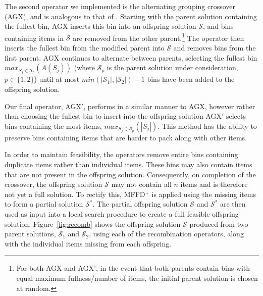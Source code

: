 \documentclass[authoryear]{elsarticle}
\begin{document}
The second operator we implemented is the alternating grouping crossover (AGX), and is analogous to that of \citet{quiroz2015}. Starting with the parent solution containing the fullest bin, AGX inserts this bin into an offspring solution $\mathcal{S}$, and bins containing items in $\mathcal{S}$ are removed from the other parent.\footnote{For both AGX and AGX', in the event that both parents contain bins with equal maximum fullness/number of items, the initial parent solution is chosen at random.} The operator then inserts the fullest bin from the modified parent into $\mathcal{S}$ and removes bins from the first parent. AGX continues to alternate between parents, selecting the fullest bin $max_{S_j \in \mathcal{S}_p} (A(S_j))$ (where $\mathcal{S}_p$ is the parent solution under consideration, $p \in \{1,2\}$) until at most $min (|\mathcal{S}_1|,|\mathcal{S}_2|) - 1$ bins have been added to the offspring solution.

Our final operator, AGX$'$, performs in a similar manner to AGX, however rather than choosing the fullest bin to insert into the offspring solution AGX$'$ selects bins containing the most items, $max_{S_j \in \mathcal{S}_p} (|S_j|)$. This method has the ability to preserve bins containing items that are harder to pack along with other items. 

In order to maintain feasibility, the operators remove entire bins containing duplicate items rather than individual items. These bins may also contain items that are not present in the offspring solution. Consequently, on completion of the crossover, the offspring solution $\mathcal{S}$ may not contain all $n$ items and is therefore not yet a full solution. To rectify this, MFFD$^+$ is applied using the missing items to form a partial solution $\mathcal{S}^*$. The partial offspring solution $\mathcal{S}$ and $\mathcal{S}^*$ are then used as input into a local search procedure to create a full feasible offspring solution. Figure~\ref{fig:recomb} shows the offspring solution $\mathcal{S}$ produced from two parent solutions, $\mathcal{S}_1$ and $\mathcal{S}_2$, using each of the recombination operators, along with the individual items missing from each offspring.

\begin{figure}[H]	
	\centering
	\begin{minipage}{0.3\textwidth}
		
	\end{minipage} \hspace{15mm}
	\begin{minipage}{0.3\textwidth}
		
	\end{minipage}
\end{figure}
\end{document}
